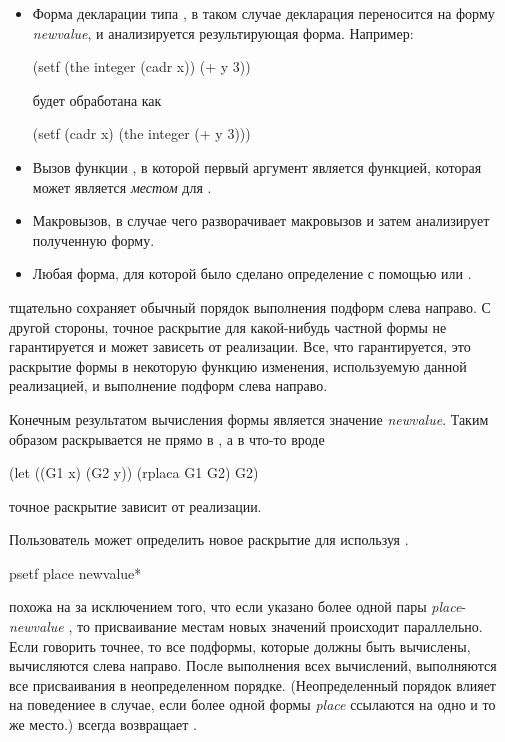 \begin{defmac}
\begin{itemize}
\item
Форма декларации типа , в таком случае декларация переносится на форму
\emph{newvalue}, и анализируется результирующая  форма. Например:
\begin{lisp}
(setf (the integer (cadr x)) (+ y 3))
\end{lisp}
будет обработана как
\begin{lisp}
(setf (cadr x) (the integer (+ y 3)))
\end{lisp}

\item 
Вызов функции , в которой первый аргумент является функцией, которая
может является \emph{местом} для .

\item 
Макровызов, в случае чего  разворачивает макровызов и затем
анализирует полученную форму.

\item 
Любая форма, для которой было сделано определение с помощью  или
.
\end{itemize}

 тщательно сохраняет обычный порядок выполнения подформ слева
направо.
С другой стороны, точное раскрытие для какой-нибудь частной формы не
гарантируется и может зависеть от реализации. Все, что гарантируется, это 
раскрытие  формы в некоторую функцию изменения, используемую данной
реализацией, и выполнение подформ слева направо.

Конечным результатом вычисления формы  является значение
\emph{newvalue}. Таким образом  раскрывается не прямо в
, а в что-то вроде
\begin{lisp}
(let ((G1 x) (G2 y)) (rplaca G1 G2) G2)
\end{lisp}
точное раскрытие зависит от реализации.

Пользователь может определить новое раскрытие для  используя
.
\end{defmac}

\begin{defmac}
psetf {place newvalue}*

 похожа на  за исключением того, что если указано более одной 
пары
\emph{place}-\emph{newvalue} , то присваивание местам новых значений 
происходит параллельно. Если говорить точнее, то все подформы, которые должны 
быть вычислены, вычисляются слева направо. После выполнения всех вычислений,
выполняются все присваивания в неопределенном порядке.
(Неопределенный порядок влияет на поведениее в случае, если более одной формы
\emph{place} ссылаются на одно и то же место.)
 всегда возвращает {\false}.
\end{defmac}

